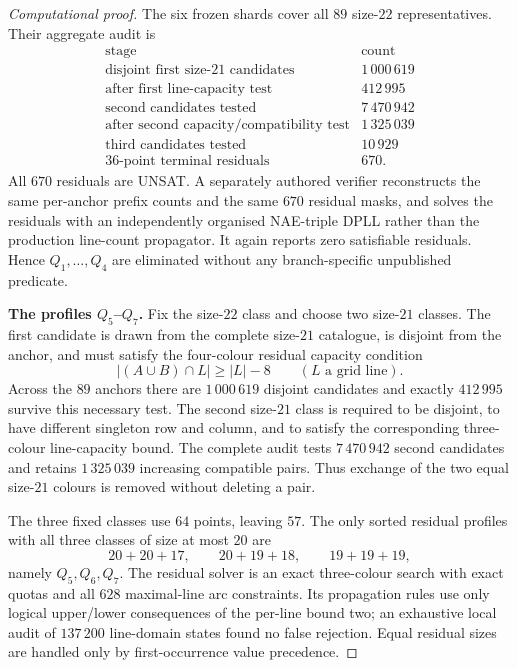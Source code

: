 \documentclass[11pt]{article}
\theoremstyle{definition}
\theoremstyle{remark}
\renewcommand{\ge}{\geqslant}
\begin{document}
\begin{proof}[Computational proof]
The six frozen shards cover all \(89\) size-\(22\) representatives.  Their
aggregate audit is
\[
\begin{array}{c|r}
\text{stage} & \text{count}\\ \hline
\text{disjoint first size-21 candidates} & 1\,000\,619\\
\text{after first line-capacity test} & 412\,995\\
\text{second candidates tested} & 7\,470\,942\\
\text{after second capacity/compatibility test} & 1\,325\,039\\
\text{third candidates tested} & 10\,929\\
\text{36-point terminal residuals} & 670.
\end{array}
\]
All \(670\) residuals are UNSAT.  A separately authored verifier reconstructs
the same per-anchor prefix counts and the same \(670\) residual masks, and
solves the residuals with an independently organised NAE-triple DPLL rather
than the production line-count propagator.  It again reports zero satisfiable
residuals.  Hence \(Q_1,\ldots,Q_4\) are eliminated without any
branch-specific unpublished predicate.

\medskip\noindent\textbf{The profiles \(Q_5\)--\(Q_7\).}\quad
Fix the size-\(22\) class and choose two size-\(21\) classes.  The first
candidate is drawn from the complete size-\(21\) catalogue, is disjoint from
the anchor, and must satisfy the four-colour residual capacity condition
\[
  |(A\cup B)\cap L|\ge |L|-8
  \qquad(L\text{ a grid line}).
\]
Across the \(89\) anchors there are \(1\,000\,619\) disjoint candidates and
exactly \(412\,995\) survive this necessary test.  The second size-\(21\)
class is required to be disjoint, to have different singleton row and column,
and to satisfy the corresponding three-colour line-capacity bound.  The
complete audit tests \(7\,470\,942\) second candidates and retains
\(1\,325\,039\) increasing compatible pairs.  Thus exchange of the two equal
size-\(21\) colours is removed without deleting a pair.

The three fixed classes use \(64\) points, leaving \(57\).  The only sorted
residual profiles with all three classes of size at most \(20\) are
\[
  20+20+17,\qquad 20+19+18,\qquad 19+19+19,
\]
namely \(Q_5,Q_6,Q_7\).  The residual solver is an exact three-colour search
with exact quotas and all \(628\) maximal-line arc constraints.  Its
propagation rules use only logical upper/lower consequences of the per-line
bound two; an exhaustive local audit of \(137\,200\) line-domain states found
no false rejection.  Equal residual sizes are handled only by first-occurrence
value precedence.


\end{proof}
\end{document}
